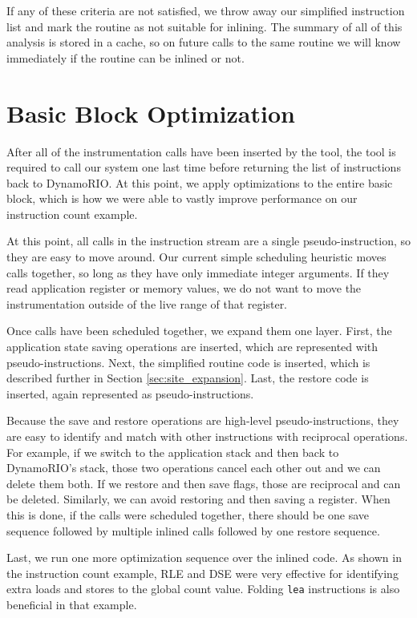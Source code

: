 If any of these criteria are not satisfied, we throw away our simplified
instruction list and mark the routine as not suitable for inlining.  The summary
of all of this analysis is stored in a cache, so on future calls to the same
routine we will know immediately if the routine can be inlined or not.

\section{Basic Block Optimization}
\label{sec:basic_block_opt}

After all of the instrumentation calls have been inserted by the tool, the tool
is required to call our system one last time before returning the list of
instructions back to DynamoRIO.  At this point, we apply optimizations to the
entire basic block, which is how we were able to vastly improve performance on
our instruction count example.

At this point, all calls in the instruction stream are a single
pseudo-instruction, so they are easy to move around.  Our current simple
scheduling heuristic moves calls together, so long as they have only immediate
integer arguments.  If they read application register or memory values, we do
not want to move the instrumentation outside of the live range of that register.

Once calls have been scheduled together, we expand them one layer.  First, the
application state saving operations are inserted, which are represented with
pseudo-instructions.  Next, the simplified routine code is inserted, which is
described further in Section \ref{sec:site_expansion}.  Last, the restore code
is inserted, again represented as pseudo-instructions.

Because the save and restore operations are high-level pseudo-instructions, they
are easy to identify and match with other instructions with reciprocal
operations.  For example, if we switch to the application stack and then back to
DynamoRIO's stack, those two operations cancel each other out and we can delete
them both.  If we restore and then save flags, those are reciprocal and can be
deleted.  Similarly, we can avoid restoring and then saving a register.  When
this is done, if the calls were scheduled together, there should be one save
sequence followed by multiple inlined calls followed by one restore sequence.

Last, we run one more optimization sequence over the inlined code.  As shown in
the instruction count example, RLE and DSE were very effective for identifying
extra loads and stores to the global count value.  Folding {\tt lea}
instructions is also beneficial in that example.

